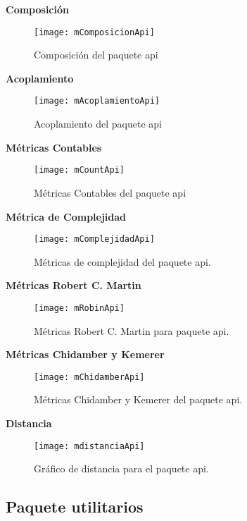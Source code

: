 \textbf{Composición}
\begin{figure}[H]
	\centering
	\texttt{[image: mComposicionApi]}
	\centering
	\caption{Composición del paquete api}
	\label{fig:mComposicionApi}
\end{figure}
\textbf{Acoplamiento}
\begin{figure}[H]
	\centering
	\texttt{[image: mAcoplamientoApi]}
	\centering
	\caption{Acoplamiento del paquete api}
	\label{fig:mAcoplamientoApi}
\end{figure}
\textbf{Métricas Contables}
\begin{figure}[H]
	\centering
	\texttt{[image: mCountApi]}
	\centering
	\caption{Métricas Contables del paquete api}
	\label{fig:mCountApi}
\end{figure}
\textbf{Métrica de Complejidad}
\begin{figure}[H]
	\centering
	\texttt{[image: mComplejidadApi]}
	\centering
	\caption{Métricas de complejidad del paquete api.}
	\label{fig:mComplejidadApi}
\end{figure}

\textbf{Métricas Robert C. Martin}
\begin{figure}[H]
	\centering
	\texttt{[image: mRobinApi]}
	\centering
	\caption{Métricas Robert C. Martin para paquete api.}
	\label{fig:mRobinApi}
\end{figure}
\clearpage
\textbf{Métricas Chidamber y Kemerer}
\begin{figure}[H]
	\centering
	\texttt{[image: mChidamberApi]}
	\centering
	\caption{Métricas Chidamber y Kemerer del paquete api.}
	\label{fig:mChidamberApi}
\end{figure}
\textbf{Distancia}
\begin{figure}[H]
	\centering
	\texttt{[image: mdistanciaApi]}
	\centering
	\caption{Gráfico de distancia para el paquete api.}
	\label{fig:mdistanciaApi}
\end{figure}
\newpage
\subsection{Paquete utilitarios}

